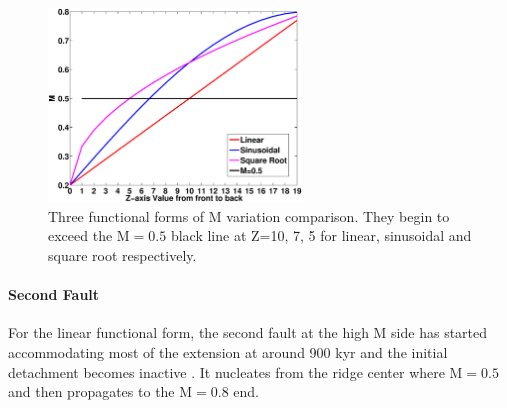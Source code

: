 \begin{figure}[h]
  \centering
    \includegraphics[width=0.6\textwidth]{./Figures/fig_Results3_1.eps}
  \caption{Three functional forms of M variation comparison. They begin to exceed the M$=0.5$ black line at Z=10, 7, 5 for linear, sinusoidal and square root respectively.}
 \label{fig_Results3_1}
\end{figure}   

\paragraph{Second Fault}\label{para_SecondaryFault}

For the linear functional form, the second fault  at the high M side has started accommodating most of the extension at around 900 kyr and the initial detachment becomes inactive . It nucleates from the ridge center where M$=0.5$ and then propagates to the M$=0.8$ end. %

